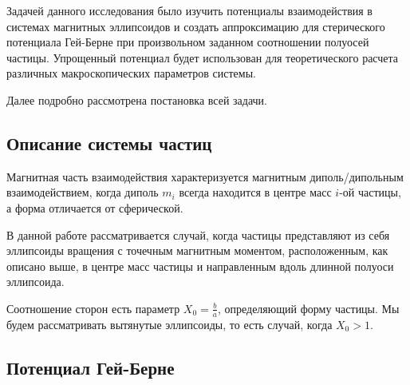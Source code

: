 \documentclass[a4paper,14pt]{extarticle}
\begin{document}
    Задачей данного исследования было изучить потенциалы взаимодействия в системах магнитных эллипсоидов и создать аппроксимацию для стерического потенциала Гей-Берне при произвольном заданном соотношении полуосей частицы. Упрощенный потенциал будет использован для теоретического расчета различных макроскопических параметров системы.

    Далее подробно рассмотрена постановка всей задачи.

    \subsection{Описание системы частиц}

    Магнитная часть взаимодействия характеризуется магнитным диполь\-/дипольным взаимодействием, когда диполь $m_i$ всегда находится в центре масс $i$-ой частицы, а форма отличается от сферической.

    В данной работе рассматривается случай, когда частицы представляют из себя эллипсоиды вращения с точечным магнитным моментом, расположенным, как описано выше, в центре масс частицы и направленным вдоль длинной полуоси эллипсоида.

    Соотношение сторон есть параметр $X_0 = \frac{b}{a}$, определяющий форму частицы. Мы будем рассматривать вытянутые эллипсоиды, то есть случай, когда $X_0 > 1$.

    \subsection{Потенциал Гей-Берне}
\end{document}

